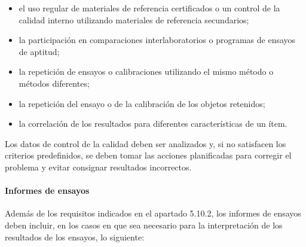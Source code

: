			\begin{itemize}
				\item el uso regular de materiales de referencia certificados o un control de la calidad interno utilizando
				materiales de referencia secundarios;
				
				\item la participación en comparaciones interlaboratorios o programas de ensayos de aptitud;
				
				\item la repetición de ensayos o calibraciones utilizando el mismo método o métodos diferentes;
				
				\item la repetición del ensayo o de la calibración de los objetos retenidos;
				
				\item la correlación de los resultados para diferentes características de un ítem.
			\end{itemize}
		
			\par \noindent
				Los datos de control de la calidad deben ser analizados y, si no satisfacen los criterios predefinidos,
				se deben tomar las acciones planificadas para corregir el problema y evitar consignar resultados incorrectos.
			
\newpage
\thispagestyle{plain}

		\paragraph{Informes de ensayos}
			\par 
				Además de los requisitos indicados en el apartado 5.10.2, los informes de ensayos deben incluir,
				en los casos en que sea necesario para la interpretación de los resultados de los ensayos, lo siguiente:
				
